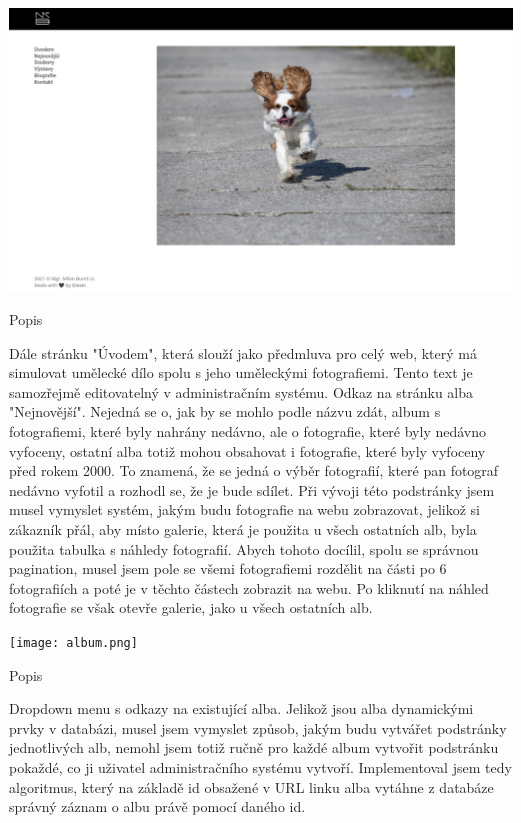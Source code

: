 \documentclass[12pt,a4paper]{report}
\begin{document}
  \vspace*{0.5cm}
  \noindent\includegraphics[width=\linewidth]{dmp-bures.png}
  \begin{center}
    Popis
  \end{center}
  \vspace*{0.5cm}

  Dále stránku "Úvodem", která slouží jako předmluva pro celý web, který má simulovat umělecké
  dílo spolu s jeho uměleckými fotografiemi. Tento text je samozřejmě editovatelný v
  administračním systému.
  Odkaz na stránku alba "Nejnovější". Nejedná se o, jak by se mohlo podle názvu zdát, album s
  fotografiemi, které byly nahrány nedávno, ale o fotografie, které byly nedávno vyfoceny, ostatní
  alba totiž mohou obsahovat i fotografie, které byly vyfoceny před rokem 2000. To znamená, že se
  jedná o výběr fotografií, které pan fotograf nedávno vyfotil a rozhodl se, že je bude sdílet. Při
  vývoji této podstránky jsem musel vymyslet systém, jakým budu fotografie na webu zobrazovat,
  jelikož si zákazník přál, aby místo galerie, která je použita u všech ostatních alb, byla použita
  tabulka s náhledy fotografií. Abych tohoto docílil, spolu se správnou pagination, musel jsem pole
  se všemi fotografiemi rozdělit na části po 6 fotografiích a poté je v těchto částech zobrazit na
  webu. Po kliknutí na náhled fotografie se však otevře galerie, jako u všech ostatních alb.
  
  \vspace*{0.5cm}
  \noindent\texttt{[image: album.png]}
  \begin{center}
    Popis
  \end{center}
  \vspace*{0.5cm}

  Dropdown menu s odkazy na existující alba. Jelikož jsou alba dynamickými prvky v databázi, musel
  jsem vymyslet způsob, jakým budu vytvářet podstránky jednotlivých alb, nemohl jsem totiž ručně
  pro každé album vytvořit podstránku pokaždé, co ji uživatel administračního systému vytvoří.
  Implementoval jsem tedy algoritmus, který na základě id obsažené v URL linku alba vytáhne z
  databáze správný záznam o albu právě pomocí daného id.
\end{document}
